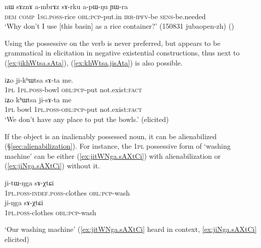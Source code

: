 \begin{exe}
\ex \label{ex:ambrAz.sArku}
\gll  nɯ sɤznɤ a-mbrɤz sɤ-rku a-pɯ-ŋu ɲɯ-ra \\
\textsc{dem} \textsc{comp} \textsc{1sg}.\textsc{poss}-rice \textsc{obl}:\textsc{pcp}-put.in \textsc{irr}-\textsc{ipfv}-be \textsc{sens}-be.needed \\
\glt  `Why don't I use [this basin] as a rice container?' (150831 jubaopen-zh)
()
\end{exe} 

Using the possessive on the verb is never preferred, but appears to be grammatical in elicitation in negative existential constructions, thus next to (\ref{ex:jikhWtsa.sAta}),  (\ref{ex:khWtsa.jisAta}) is also possible.
\begin{exe}
\ex
\begin{xlist}
\ex \label{ex:jikhWtsa.sAta}
\gll iʑo ji-kʰɯtsa sɤ-ta me. \\
\textsc{1pl} \textsc{1pl}.\textsc{poss}-bowl  \textsc{obl}:\textsc{pcp}-put not.exist:\textsc{fact} \\ 
\ex \label{ex:khWtsa.jisAta}
\gll iʑo kʰɯtsa ji-sɤ-ta me  \\
\textsc{1pl} bowl \textsc{1pl}.\textsc{poss}-\textsc{obl}:\textsc{pcp}-put not.exist:\textsc{fact} \\ 
\glt `We  don't have any place to put the bowls.' (elicited)
\end{xlist}
\end{exe} 


If the object is an inalienably possessed noun, it can be alienabilized (§\ref{sec:alienabilization}). For instance, the \textsc{1pl} possessive form of  `washing machine' can be either (\ref{ex:jitWNga.sAXtCi}) with alienabilization or (\ref{ex:jiNga.sAXtCi}) without it.

\begin{exe}
\ex
\begin{xlist}
\ex \label{ex:jitWNga.sAXtCi}
\gll ji-tɯ-ŋga sɤ-χtɕi \\
\textsc{1pl}.\textsc{poss}-\textsc{indef}.\textsc{poss}-clothes \textsc{obl}:\textsc{pcp}-wash \\
\ex \label{ex:jiNga.sAXtCi}
\gll ji-ŋga sɤ-χtɕi \\
\textsc{1pl}.\textsc{poss}-clothes \textsc{obl}:\textsc{pcp}-wash \\
\end{xlist}
\glt `Our washing machine' (\ref{ex:jitWNga.sAXtCi} heard in context, \ref{ex:jiNga.sAXtCi} elicited)
\end{exe}

